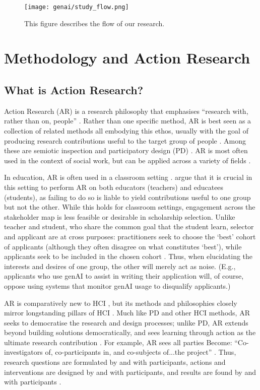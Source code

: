 \begin{figure}[htbp]
  \centering
  \texttt{[image: genai/study\_flow.png]}
  \caption{This figure describes the flow of our research.}
  \label{fig:flow}
\end{figure}

\section{Methodology and Action Research}\label{sec:embedded}
\subsection{What is Action Research?}\label{ssec:par}
Action Research (AR) is a research philosophy that emphasises ``research with, rather than on, people'' \cite{bradbury_action_2003}. Rather than one specific method, AR is best seen as a collection of related methods all embodying this ethos, usually with the goal of producing research contributions useful to the target group of people \cite{lu_organizing_2023}. Among these are semiotic inspection \cite{DeSouza_Leitão_2009,Alvarado_Waern_2018} and participatory design  (PD) \cite{braun_using_2006,Griffiths_Johnson_Hartley_2007,blythe2014research,Knapp_Zeratzky_Kowitz_2016}. AR is most often used in the context of social work, but can be applied across a variety of fields \cite{dombrowski_social_2016,lu_organizing_2023}. 

In education, AR is often used in a classroom setting \cite{Mertler_2019}. \textcite{venn-wycherley_realities_2024} argue that it is crucial in this setting to perform AR on both educators (teachers) and educatees (students), as failing to do so is liable to yield contributions useful to one group but not the other. While this holds for classroom settings, engagement across the stakeholder map is less feasible or desirable in scholarship selection. Unlike teacher and student, who share the common goal that the student learn, selector and applicant are at cross purposes: practitioners seek to choose the `best' cohort of applicants (although they often disagree on what constitutes `best'), while applicants seek to be included in the chosen cohort \cite{bergman2021seven}. Thus, when elucidating the interests and desires of one group, the other will merely act as noise. (E.g., applicants who use genAI to assist in writing their application will, of course, oppose using systems that monitor genAI usage to disqualify applicants.)

AR is comparatively new to HCI \cite{Hayes_2011,lu_organizing_2023}, but its methods and philosophies closely mirror longstanding pillars of HCI \cite{Hayes_2011}. Much like PD and other HCI methods, AR seeks to democratise the research and design processes; unlike PD, AR extends beyond building solutions democratically, and sees learning through action as the ultimate research contribution \cite{Hayes_2011}. For example, AR sees all parties Become: ``Co-investigators of, co-participants in, and co-subjects of...the project'' \cite{Hayes_2011}.  Thus, research questions are formulated by and with participants, actions and interventions are designed by and with participants, and results are found by and with participants \cite{Hayes_2011}.

